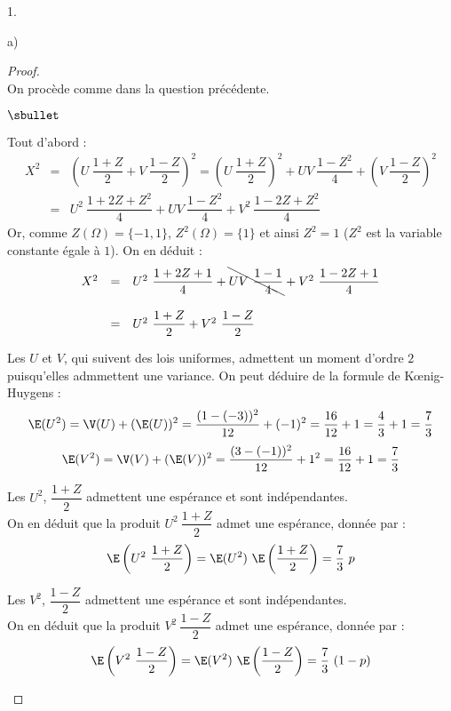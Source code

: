 \documentclass[11pt]{article}%
\begin{document}
\begin{noliste}{1.}
\begin{noliste}{a)}
    \begin{proof}~\\
      On procède comme dans la question précédente.
      \begin{noliste}{$\sbullet$}
      \item Tout d'abord :
        \[
        \begin{array}{rcl}
          X^2 & = & \left( U \ \dfrac{1+Z}{2} + V \ \dfrac{1-Z}{2} \right)^2
          = \left( U \ \dfrac{1+Z}{2} \right)^2 + UV \ \dfrac{1 -
            Z^2}{4} + \left( V \ \dfrac{1-Z}{2} \right)^2 \\[.6cm]
          & = & U^2 \ \dfrac{1 + 2Z + Z^2}{4} + UV \ \dfrac{1 -
            Z^2}{4} + V^2 \ \dfrac{1 - 2Z + Z^2}{4} 
        \end{array}
        \]
        Or, comme $Z(\Omega) = \{-1, 1\}$, $Z^2(\Omega) = \{1\}$ et
        ainsi $Z^2 = 1$ ($Z^2$ est la variable constante égale à $1$).
        On en déduit :
        \[
        \begin{array}{rcl}
          X^2 & = & U^2 \ \dfrac{1 + 2Z + 1}{4} + \bcancel{UV \ \dfrac{1 -
              1}{4}} + V^2 \ \dfrac{1 - 2Z + 1}{4} \\[.6cm]
          & = & U^2 \ \dfrac{1 + Z}{2} + V^2 \ \dfrac{1 - Z}{2}
        \end{array}
        \]

      \item Les \var $U$ et $V$, qui suivent des lois uniformes,
        admettent un moment d'ordre $2$ puisqu'elles admmettent une
        variance. On peut déduire de la formule de K\oe{}nig-Huygens :
        \[
        \E(U^2) = \V(U) + (\E(U))^2 = \dfrac{(1-(-3))^2}{12} + (-1)^2
        = \dfrac{16}{12} + 1 = \dfrac{4}{3} + 1 = \dfrac{7}{3}
        \]
        \[
        \E(V^2) = \V(V) + (\E(V))^2 = \dfrac{(3-(-1))^2}{12} + 1^2 =
        \dfrac{16}{12} + 1 = \dfrac{7}{3}
        \]

      \item Les \var $U^2$, $\dfrac{1 + Z}{2}$ admettent une espérance
        et sont indépendantes.\\
        On en déduit que la \var produit $U^2 \ \dfrac{1 + Z}{2}$
        admet une espérance, donnée par :
        \[
        \E\left( U^2 \ \dfrac{1 + Z}{2} \right) = \E(U^2) \
        \E\left(\dfrac{1 + Z}{2}\right) = \dfrac{7}{3} \ p
        \]

      \item Les \var $V^2$, $\dfrac{1 - Z}{2}$ admettent une espérance
        et sont indépendantes. \\
        On en déduit que la \var produit $V^2 \ \dfrac{1 - Z}{2}$
        admet une espérance, donnée par :
        \[
        \E\left( V^2 \ \dfrac{1 - Z}{2} \right) = \E(V^2) \
        \E\left(\dfrac{1 - Z}{2} \right) = \dfrac{7}{3} \ (1-p)
        \]


\end{noliste}
\end{proof}
\end{noliste}
\end{noliste}
\end{document}
